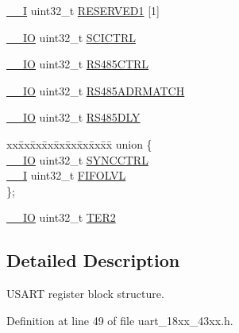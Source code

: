 \begin{DoxyCompactItemize}
\item 
\hyperlink{core__sc300_8h_af63697ed9952cc71e1225efe205f6cd3}{\+\_\+\+\_\+I} uint32\+\_\+t \hyperlink{struct_l_p_c___u_s_a_r_t___t_a56453758b5fec0a80c808f746e3db741}{R\+E\+S\+E\+R\+V\+E\+D1} \mbox{[}1\mbox{]}
\item 
\hyperlink{core__sc300_8h_aec43007d9998a0a0e01faede4133d6be}{\+\_\+\+\_\+\+IO} uint32\+\_\+t \hyperlink{struct_l_p_c___u_s_a_r_t___t_aa8ad1461441995d0b618ff7f5b0e42be}{S\+C\+I\+C\+T\+RL}
\item 
\hyperlink{core__sc300_8h_aec43007d9998a0a0e01faede4133d6be}{\+\_\+\+\_\+\+IO} uint32\+\_\+t \hyperlink{struct_l_p_c___u_s_a_r_t___t_a6a7e49f50f49efbe8e11befcf6e7d6b4}{R\+S485\+C\+T\+RL}
\item 
\hyperlink{core__sc300_8h_aec43007d9998a0a0e01faede4133d6be}{\+\_\+\+\_\+\+IO} uint32\+\_\+t \hyperlink{struct_l_p_c___u_s_a_r_t___t_adfc2810503e8eb5f4d9bc4622500295e}{R\+S485\+A\+D\+R\+M\+A\+T\+CH}
\item 
\hyperlink{core__sc300_8h_aec43007d9998a0a0e01faede4133d6be}{\+\_\+\+\_\+\+IO} uint32\+\_\+t \hyperlink{struct_l_p_c___u_s_a_r_t___t_a6e9fc8109a269820386a36c81dc943ab}{R\+S485\+D\+LY}
\item 
\begin{tabbing}
xx\=xx\=xx\=xx\=xx\=xx\=xx\=xx\=xx\=\kill
union \{\\
\>\hyperlink{core__sc300_8h_aec43007d9998a0a0e01faede4133d6be}{\_\_IO} uint32\_t \hyperlink{struct_l_p_c___u_s_a_r_t___t_a799433e27ab7a1b61ba215ff1766a3e0}{SYNCCTRL}\\
\>\hyperlink{core__sc300_8h_af63697ed9952cc71e1225efe205f6cd3}{\_\_I} uint32\_t \hyperlink{struct_l_p_c___u_s_a_r_t___t_a1e5a80261f84a375eda3b575bea8074a}{FIFOLVL}\\
\}; \\

\end{tabbing}\item 
\hyperlink{core__sc300_8h_aec43007d9998a0a0e01faede4133d6be}{\+\_\+\+\_\+\+IO} uint32\+\_\+t \hyperlink{struct_l_p_c___u_s_a_r_t___t_afc422e0333356dc62b23d404bfdbd1de}{T\+E\+R2}
\end{DoxyCompactItemize}


\subsection{Detailed Description}
U\+S\+A\+RT register block structure. 

Definition at line 49 of file uart\+\_\+18xx\+\_\+43xx.\+h.



